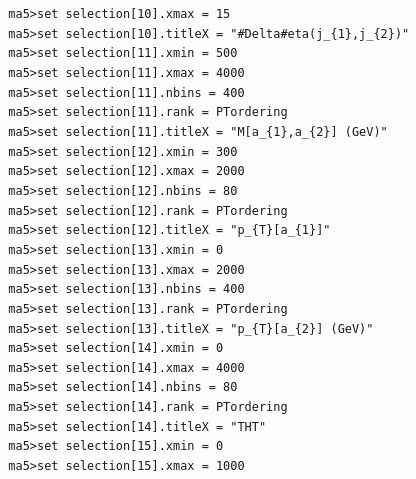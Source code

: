 \documentclass[a4paper, 10pt]{article}
\begin{document}
\texttt{ }\texttt{ }\texttt{ma5>set selection[10].xmax = 15\\
}
\texttt{ }\texttt{ }\texttt{ma5>set selection[10].titleX = "\#Delta\#eta(j\_\{1\},j\_\{2\})"\\
}
\texttt{ }\texttt{ }\texttt{ma5>set selection[11].xmin = 500\\
}
\texttt{ }\texttt{ }\texttt{ma5>set selection[11].xmax = 4000\\
}
\texttt{ }\texttt{ }\texttt{ma5>set selection[11].nbins = 400\\
}
\texttt{ }\texttt{ }\texttt{ma5>set selection[11].rank = PTordering\\
}
\texttt{ }\texttt{ }\texttt{ma5>set selection[11].titleX = "M[a\_\{1\},a\_\{2\}] (GeV)"\\
}
\texttt{ }\texttt{ }\texttt{ma5>set selection[12].xmin = 300\\
}
\texttt{ }\texttt{ }\texttt{ma5>set selection[12].xmax = 2000\\
}
\texttt{ }\texttt{ }\texttt{ma5>set selection[12].nbins = 80\\
}
\texttt{ }\texttt{ }\texttt{ma5>set selection[12].rank = PTordering\\
}
\texttt{ }\texttt{ }\texttt{ma5>set selection[12].titleX = "p\_\{T\}[a\_\{1\}]"\\
}
\texttt{ }\texttt{ }\texttt{ma5>set selection[13].xmin = 0\\
}
\texttt{ }\texttt{ }\texttt{ma5>set selection[13].xmax = 2000\\
}
\texttt{ }\texttt{ }\texttt{ma5>set selection[13].nbins = 400\\
}
\texttt{ }\texttt{ }\texttt{ma5>set selection[13].rank = PTordering\\
}
\texttt{ }\texttt{ }\texttt{ma5>set selection[13].titleX = "p\_\{T\}[a\_\{2\}] (GeV)"\\
}
\texttt{ }\texttt{ }\texttt{ma5>set selection[14].xmin = 0\\
}
\texttt{ }\texttt{ }\texttt{ma5>set selection[14].xmax = 4000\\
}
\texttt{ }\texttt{ }\texttt{ma5>set selection[14].nbins = 80\\
}
\texttt{ }\texttt{ }\texttt{ma5>set selection[14].rank = PTordering\\
}
\texttt{ }\texttt{ }\texttt{ma5>set selection[14].titleX = "THT"\\
}
\texttt{ }\texttt{ }\texttt{ma5>set selection[15].xmin = 0\\
}
\texttt{ }\texttt{ }\texttt{ma5>set selection[15].xmax = 1000\\
}
\end{document}
